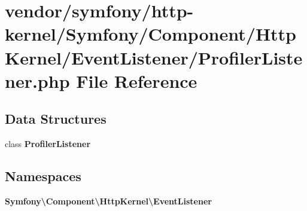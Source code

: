 \section{vendor/symfony/http-\/kernel/\+Symfony/\+Component/\+Http\+Kernel/\+Event\+Listener/\+Profiler\+Listener.php File Reference}
\label{_profiler_listener_8php}
\subsection*{Data Structures}
\begin{DoxyCompactItemize}
\item 
class {\bf Profiler\+Listener}
\end{DoxyCompactItemize}
\subsection*{Namespaces}
\begin{DoxyCompactItemize}
\item 
 {\bf Symfony\textbackslash{}\+Component\textbackslash{}\+Http\+Kernel\textbackslash{}\+Event\+Listener}
\end{DoxyCompactItemize}
